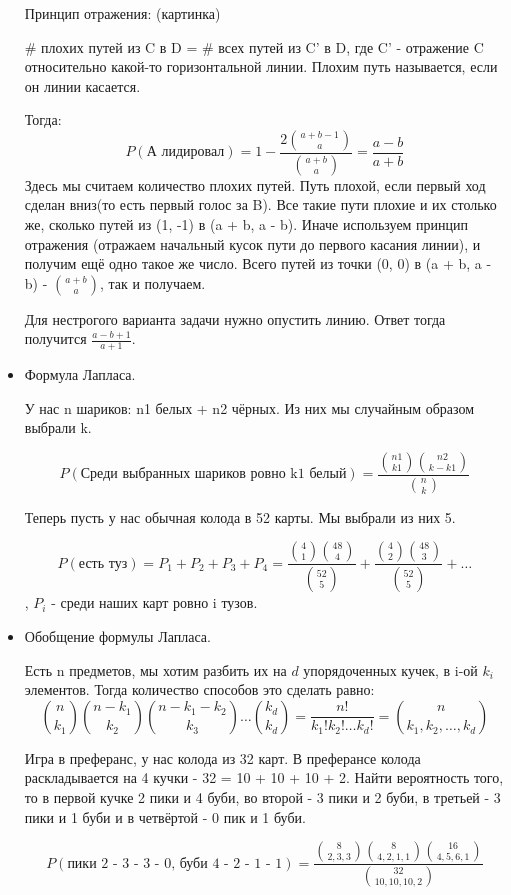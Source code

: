\begin{itemize}
	Принцип отражения: (картинка)
	
	\# плохих путей из C в D = \# всех путей из C' в D, где C' - отражение C относительно какой-то горизонтальной линии. Плохим путь называется, если он линии касается.
	
	Тогда:
	\[P(\text{А лидировал}) = 1 - \frac{2\binom{a + b - 1}{a}}{\binom{a + b}{a}} = \frac{a - b}{a + b}\]
	Здесь мы считаем количество плохих путей. Путь плохой, если первый ход сделан вниз(то есть первый голос за B). Все такие пути плохие и их столько же, сколько путей из (1, -1) в (a + b, a - b). Иначе используем принцип отражения (отражаем начальный кусок пути до первого касания линии), и получим ещё одно такое же число. Всего путей из точки (0, 0) в (a + b, a - b) - $\binom{a + b}{a}$, так и получаем.
	
	Для нестрогого варианта задачи нужно опустить линию. Ответ тогда получится $\frac{a - b + 1}{a + 1}$.
	
	\item Формула Лапласа.
	
	У нас n шариков: n1 белых + n2 чёрных. Из них мы случайным образом выбрали k.
	
	\[P(\text{Среди выбранных шариков ровно k1 белый}) = \frac{\binom{n1}{k1}\binom{n2}{k - k1}}{\binom{n}{k}}\]
	
	Теперь пусть у нас обычная колода в 52 карты. Мы выбрали из них 5.
	
	\[P(\text{есть туз}) = P_1 + P_2 + P_3 + P_4 = \frac{\binom{4}{1}\binom{48}{4}}{\binom{52}{5}} + \frac{\binom{4}{2}\binom{48}{3}}{\binom{52}{5}} + \dots\], $P_i$ - среди наших карт ровно i тузов.
	
	\item Обобщение формулы Лапласа.
	
	Есть n предметов, мы хотим разбить их на $d$ упорядоченных кучек, в i-ой $k_i$ элементов. Тогда количество способов это сделать равно:
	\[\binom{n}{k_1}\binom{n - k_1}{k_2}\binom{n - k_1 - k_2}{k_3} \dots \binom{k_d}{k_d} = \frac{n!}{k_1!k_2!\dots k_d!} = \binom{n}{k_1, k_2, \dots, k_d}\]
	
	Игра в преферанс, у нас колода из 32 карт. В преферансе колода раскладывается на 4 кучки - 32 = 10 + 10 + 10 + 2. Найти вероятность того, то в первой кучке 2 пики и 4 буби, во второй - 3 пики и 2 буби, в третьей - 3 пики и 1 буби и в четвёртой - 0 пик и 1 буби.
	
	\[P(\text{пики 2 - 3 - 3 - 0, буби 4 - 2 - 1 - 1}) = \frac{\binom{8}{2, 3, 3} \binom{8}{4, 2, 1, 1}\binom{16}{4, 5, 6, 1}}{\binom{32}{10, 10, 10, 2}} \]
	

\end{itemize}
